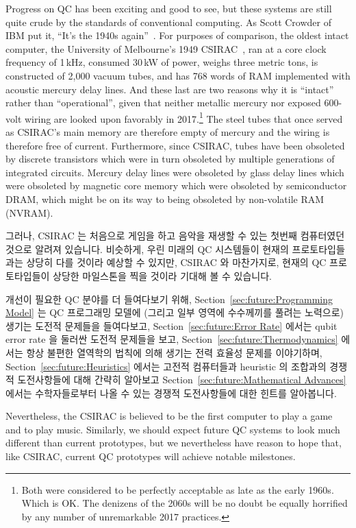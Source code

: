 Progress on QC has been exciting and good to see, but these systems are
still quite crude by the standards of conventional computing.
As Scott Crowder of IBM put it,
``It's the 1940s again''~\cite{BradJones2017IBM-QC-Crowder}.
For purposes of comparison, the oldest intact computer, the
University of Melbourne's 1949
CSIRAC~\cite{CSIRACMuseumVictoria,CSIRACUniversityMelbourne},
ran at a core clock frequency of 1\,kHz, consumed 30\,kW of power,
weighs three metric tons,
is constructed of 2,000 vacuum tubes, and has 768 words of RAM
implemented with acoustic mercury delay lines.
And these last are two reasons why it is ``intact'' rather than
``operational'', given that
neither metallic mercury nor exposed 600-volt wiring are
looked upon favorably in 2017.\footnote{
	Both were considered to be perfectly acceptable as late as the
	early 1960s.
	Which is OK.
	The denizens of the 2060s will be no doubt be equally horrified
	by any number of unremarkable 2017 practices.}
The steel tubes that once served as CSIRAC's main memory are therefore
empty of mercury and the wiring is therefore free of current.
Furthermore, since CSIRAC, tubes have been obsoleted by discrete
transistors which were in turn obsoleted by multiple generations of
integrated circuits.
Mercury delay lines were obsoleted by glass delay lines which were
obsoleted by magnetic core memory which were obsoleted by
semiconductor DRAM, which might be on its way to being obsoleted
by non-volatile RAM (NVRAM).
\fi

그러나, CSIRAC 는 처음으로 게임을 하고 음악을 재생할 수 있는 첫번째 컴퓨터였던
것으로 알려져 있습니다.
비슷하게, 우린 미래의 QC 시스템들이 현재의 프로토타입들과는 상당히 다를 것이라
예상할 수 있지만, CSIRAC 와 마찬가지로, 현재의 QC 프로토타입들이 상당한
마일스톤을 찍을 것이라 기대해 볼 수 있습니다.

개선이 필요한 QC 분야를 더 들여다보기 위해,
Section~\ref{sec:future:Programming Model} 는 QC 프로그래밍 모델에 (그리고 일부
영역에 수수께끼를 풀려는 노력으로) 생기는 도전적 문제들을 들여다보고,
Section~\ref{sec:future:Error Rate} 에서는 qubit error rate 을 둘러싼 도전적
문제들을 보고,
Section~\ref{sec:future:Thermodynamics} 에서는 항상 불편한 열역학의 법칙에 의해
생기는 전력 효율성 문제를 이야기하며,
Section~\ref{sec:future:Heuristics} 에서는 고전적 컴퓨터들과 heuristic 의
조합과의 경쟁적 도전사항들에 대해 간략히 알아보고
Section~\ref{sec:future:Mathematical Advances} 에서는 수학자들로부터 나올 수
있는 경쟁적 도전사항들에 대한 힌트를 알아봅니다.
\iffalse

Nevertheless, the CSIRAC is believed to be the first computer to
play a game and to play music.
Similarly, we should expect future QC systems to look much different
than current prototypes, but we nevertheless have reason to hope that,
like CSIRAC, current QC prototypes will achieve notable milestones.

